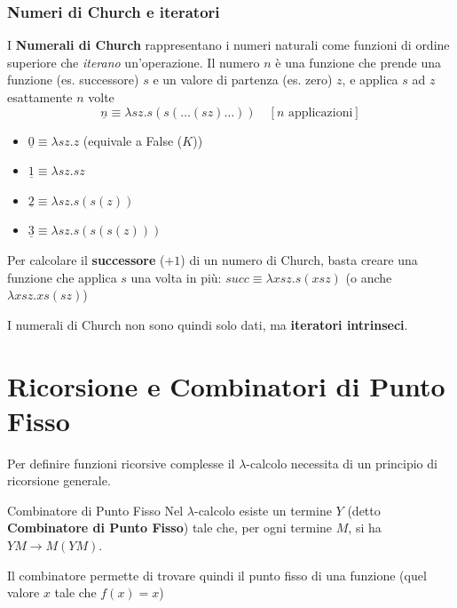 \subsubsection{Numeri di Church e iteratori}
I \textbf{Numerali di Church} rappresentano i numeri naturali come funzioni di ordine superiore che \textit{iterano} un'operazione. Il numero $n$ è una funzione che prende una funzione (es. successore) $s$ e un valore di partenza (es. zero) $z$, e applica $s$ ad $z$ esattamente $n$ volte
$$\underline{n} \equiv \lambda s z. s(s(\dots(sz)\dots)) \quad [n\text{ applicazioni}]$$
\begin{itemize}
    \item $\underline{0} \equiv \lambda s z. z$ (equivale a False ($K$)) 
    \item $\underline{1} \equiv \lambda s z. s z$
    \item $\underline{2} \equiv \lambda s z. s(s(z))$
    \item $\underline{3} \equiv \lambda s z. s(s(s(z)))$
\end{itemize}

Per calcolare il \textbf{successore} ($+1$) di un numero di Church, basta creare una funzione che applica $s$ una volta in più: $succ \equiv \lambda x s z. s(x s z)$ (o anche $\lambda x s z. xs (s z)$)

I numerali di Church non sono quindi solo dati, ma \textbf{iteratori intrinseci}.

\section{Ricorsione e Combinatori di Punto Fisso}
Per definire funzioni ricorsive complesse il $\lambda$-calcolo necessita di un principio di ricorsione generale. 

\begin{thmframe}{Combinatore di Punto Fisso}{}
 Nel $\lambda$-calcolo esiste un termine $Y$ (detto \textbf{Combinatore di Punto Fisso}) tale che, per ogni termine $M$, si ha $Y M \rightarrow M (Y M)$. 
 
 Il combinatore permette di trovare quindi il punto fisso di una funzione (quel valore $x$ tale che $f(x) = x$)
\end{thmframe}

